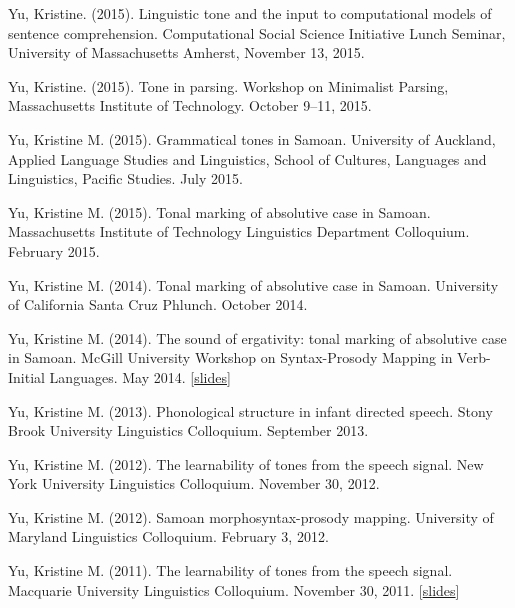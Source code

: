 \documentclass[10pt]{article}
\begin{document}
\begin{bibenum}
  \item Yu, Kristine. (2015). Linguistic tone and the input to
    computational models of sentence comprehension. Computational
    Social Science Initiative Lunch Seminar, University of
    Massachusetts Amherst, November 13, 2015.

  \item Yu, Kristine. (2015). Tone in parsing. Workshop on Minimalist
    Parsing, Massachusetts Institute of Technology. October 9--11, 2015.

    \item Yu, Kristine M. (2015). Grammatical tones in
      Samoan. University of Auckland, Applied Language Studies and Linguistics, School of Cultures, Languages and Linguistics, Pacific Studies. July 2015.

    \item Yu, Kristine M. (2015). Tonal marking of absolutive case in Samoan. Massachusetts Institute of
      Technology Linguistics Department Colloquium. February 2015.

    \item Yu, Kristine M. (2014). Tonal marking of absolutive case in
      Samoan. University of California Santa Cruz Phlunch. October 2014.

    \item Yu, Kristine M. (2014). The sound of ergativity: tonal
      marking of absolutive case in Samoan. McGill University Workshop
      on Syntax-Prosody Mapping in Verb-Initial Languages. May 2014. [\href{https://speakerdeck.com/krisyu/tonal-marking-of-absolutive-case-in-samoan}{slides}]

    \item Yu, Kristine M. (2013). Phonological structure in infant
      directed speech. Stony Brook University Linguistics Colloquium. September 2013.

    \item Yu, Kristine M. (2012). The learnability of tones from the
      speech signal. New York University Linguistics Colloquium. November 30, 2012. 

    \item Yu, Kristine M. (2012). Samoan morphosyntax-prosody
      mapping. University of Maryland Linguistics Colloquium. February
      3, 2012.

    \item Yu, Kristine M. (2011). The learnability of tones from the
      speech signal. Macquarie University Linguistics
      Colloquium. November 30, 2011. [\href{https://speakerdeck.com/krisyu/the-learnability-of-the-tones-from-the-speech-signal}{slides}]


\end{bibenum}
\end{document}
